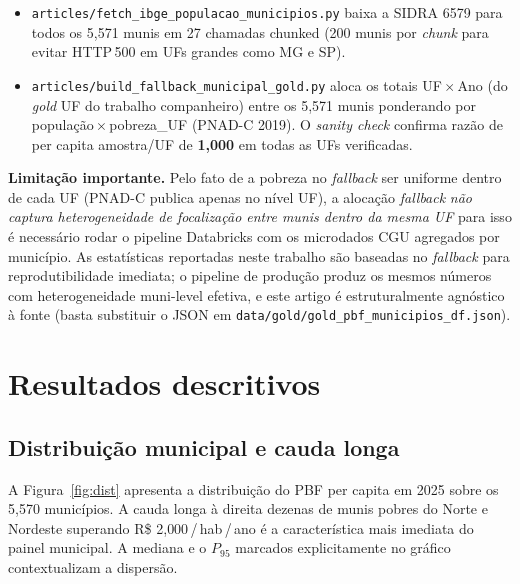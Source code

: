 \documentclass[12pt,a4paper,oneside]{article}
\newcommand{\rs}{R\$\,}
\begin{document}
\begin{itemize}
    \item \texttt{articles/fetch\_ibge\_populacao\_municipios.py} \textemdash{}
    baixa a SIDRA 6579 para todos os 5{,}571 munis em 27 chamadas
    chunked (200 munis por \textit{chunk} para evitar HTTP\,500 em
    UFs grandes como MG e SP).

    \item \texttt{articles/build\_fallback\_municipal\_gold.py}
    \textemdash{} aloca os totais UF\,$\times$\,Ano (do \textit{gold}
    UF do trabalho companheiro) entre os 5{,}571 munis ponderando por
    população\,$\times$\,pobreza\_UF (PNAD-C 2019). O \textit{sanity check}
    confirma razão de per capita amostra/UF de \textbf{1{,}000} em
    todas as UFs verificadas.
\end{itemize}

\textbf{Limitação importante.} Pelo fato de a pobreza no
\textit{fallback} ser uniforme dentro de cada UF (PNAD-C publica
apenas no nível UF), a alocação \textit{fallback} \emph{não captura
heterogeneidade de focalização entre munis dentro da mesma UF}
\textemdash{} para isso é necessário rodar o pipeline Databricks com
os microdados CGU agregados por município. As estatísticas reportadas
neste trabalho são baseadas no \textit{fallback} para reprodutibilidade
imediata; o pipeline de produção produz os mesmos números com
heterogeneidade muni-level efetiva, e este artigo é estruturalmente
agnóstico à fonte (basta substituir o JSON em
\texttt{data/gold/gold\_pbf\_municipios\_df.json}).

\section{Resultados descritivos}\label{sec:descritiva}

\subsection{Distribuição municipal e cauda longa}

A Figura~\ref{fig:dist} apresenta a distribuição do PBF per capita
em 2025 sobre os 5{,}570 municípios. A cauda longa à direita
\textemdash{} dezenas de munis pobres do Norte e Nordeste superando
\rs\,2{,}000\,/\,hab\,/\,ano \textemdash{} é a característica mais
imediata do painel municipal. A mediana e o $P_{95}$ marcados
explicitamente no gráfico contextualizam a dispersão.
\end{document}
